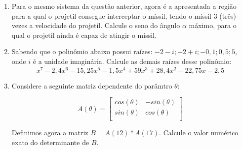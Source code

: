 \documentclass[a4paper,11pt,oneside,brazilian]{article}
\begin{document}
\begin{enumerate}[{R}1]
\begin{figure}[H]
\centering
{}
\end{figure}

\nopagebreak[4]
\item Para o mesmo sistema da questão anterior, agora é a apresentada a região
para a qual o projetil consegue interceptar o míssil, tendo o míssil 3 (três)
vezes a velocidade do projetil. Calcule o seno do ângulo $\alpha$ máximo,
para o qual o projetil ainda é capaz de atingir o míssil.

\item Sabendo que o polinômio abaixo possui raízes: $-2-i; -2+i; -0,1; 0,5; 5$,
onde $i$ é a unidade imaginária. Calcule as demais raízes desse polinômio: 
\[x^7 - 2,4 x^6 - 15,25 x^5 - 1,5 x^4 + 59x^3 + 28,4 x^2 - 22,75 x - 2,5 \]

\item Considere a seguinte matriz dependente do parâmtro $\theta$:

  \[ A(\theta) = 
	\begin{bmatrix}
	cos(\theta) & -sin(\theta)\\
	sin(\theta) & cos(\theta)\\
	\end{bmatrix}
  \]
  
  Definimos agora a matriz $B=A(12)*A(17)$. Calcule o valor numérico exato do
  determinante de $B$.

\end{enumerate}
\end{document}
